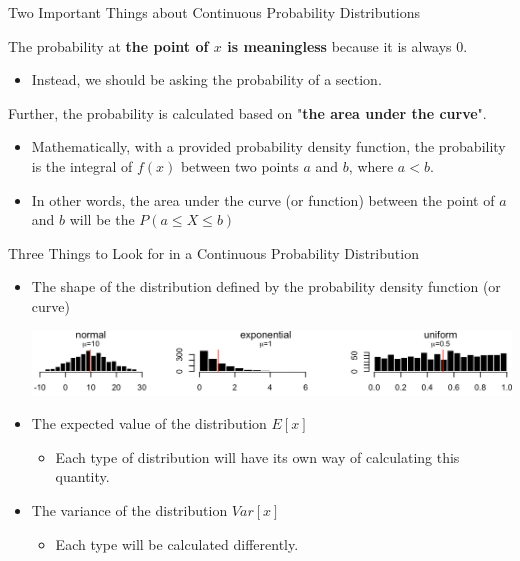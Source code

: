 \documentclass{beamer}
\begin{document}
\begin{frame}{Two Important Things about Continuous Probability Distributions}

The probability at \textbf{the point of $x$ is meaningless} because it is always $0$. 
\begin{itemize}
\item Instead, we should be asking the probability of a section.
\end{itemize}

\vspace{0.3 cm}
Further, the probability is calculated based on "\textbf{the area under the curve}".

\begin{itemize}
\item Mathematically, with a provided probability density function, the probability is the integral of $f(x)$ between two points $a$ and $b$, where $a<b$.
\item In other words, the area under the curve (or function) between the point of $a$ and $b$ will be the $P(a \leq X \leq b)$
\end{itemize} 

\end{frame}


\begin{frame}{Three Things to Look for in a Continuous Probability Distribution}

\begin{itemize}
\item The shape of the distribution defined by the probability density function (or curve)

\begin{center}
\includegraphics[scale=0.3]{images/section4StatisticalDistributions.png}
\end{center}

\item The expected value of the distribution $E[x]$
\begin{itemize}
\item Each type of distribution will have its own way of calculating this quantity. 
\end{itemize}

\item The variance of the distribution $Var[x]$

\begin{itemize}
\item Each type will be calculated differently. 
\end{itemize}


\end{itemize}
\end{frame}
\end{document}
